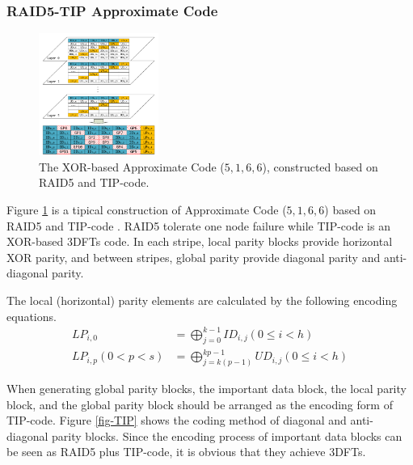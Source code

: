 \documentclass[sigconf]{acmart}
\begin{document}
\subsubsection{RAID5-TIP Approximate Code}
\begin{figure}[h]
\centering
\includegraphics[width=0.35\textwidth]{photo/AP-TIP-v2.pdf}
\caption{The XOR-based Approximate Code ($5,1,6,6$), constructed based on RAID5 and TIP-code.}
\label{fig-ap-TIP}
\end{figure}

Figure \ref{fig-ap-TIP} is a tipical construction of Approximate Code ($5,1,6,6$) based on RAID5 and TIP-code \cite{zhang2015tip}. RAID5 tolerate one node failure while TIP-code is an XOR-based 3DFTs code. In each stripe, local parity blocks provide horizontal XOR parity, and between stripes, global parity provide diagonal parity and anti-diagonal parity. 

The local (horizontal) parity elements are calculated by the following encoding equations.
\begin{align}
    LP_{i,0} &= \bigoplus_{j=0}^{k-1} ID_{i,j} (0 \leqslant i < h)\\
    LP_{i,p}(0<p<s) &= \bigoplus_{j=k(p-1)}^{kp-1} UD_{i,j} (0 \leqslant i < h)
\end{align}

When generating global parity blocks, the important data block, the local parity block, and the global parity block should be arranged as the encoding form of TIP-code. Figure \ref{fig-TIP} shows the coding method of diagonal and anti-diagonal parity blocks.
Since the encoding process of important data blocks can be seen as RAID5 plus TIP-code, it is obvious that they achieve 3DFTs.
\end{document}
